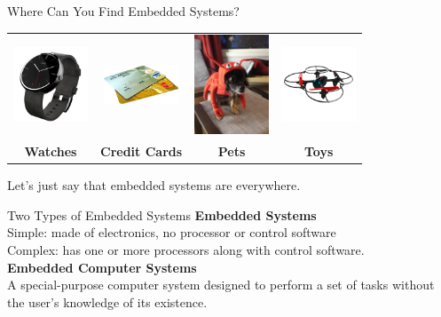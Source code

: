 \documentclass{beamer}
\begin{document}
	\begin{frame}{Where Can You Find Embedded Systems?}
		\begin{tabular}{c c c c}		
			\includegraphics[width=6em]{img/Motorola_Moto_360_Minimal_Watch_Face.png} &
			\includegraphics[width=6em]{img/creditcards.png} &
			\includegraphics[width=6em]{img/IMG_0198} &
			\includegraphics[width=6em]{img/electro_max_eye_720p_video_drone_angle_left} \\
			\tiny{\textbf{Watches}} &
			\tiny{\textbf{Credit Cards}} &
			\tiny{\textbf{Pets}} &
			\tiny{\textbf{Toys}}
		\end{tabular}
		
		\vspace{3em}	
		
		Let's just say that embedded systems are everywhere.
	\end{frame}
  
    \begin{frame}{Two Types of Embedded Systems}
    \textbf{Embedded Systems} \\
     Simple: made of electronics, no processor or control software \\ 
     Complex: has one or more processors along with control software. \\
     \vspace{1em}
     \textbf{Embedded Computer Systems} \\
     A special-purpose computer system designed to perform a set of tasks without the user's knowledge of its existence.
    \end{frame}  
  
\end{document}
